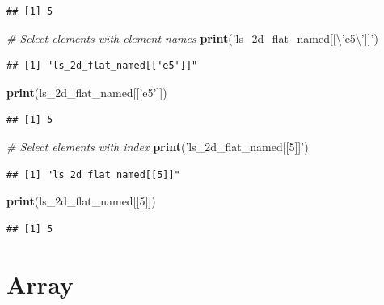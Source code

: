 \documentclass[
]{book}
\newenvironment{Shaded}{\begin{snugshade}}{\end{snugshade}}
\newcommand{\CharTok}[1]{\textcolor[rgb]{0.31,0.60,0.02}{#1}}
\newcommand{\CommentTok}[1]{\textcolor[rgb]{0.56,0.35,0.01}{\textit{#1}}}
\newcommand{\DecValTok}[1]{\textcolor[rgb]{0.00,0.00,0.81}{#1}}
\newcommand{\KeywordTok}[1]{\textcolor[rgb]{0.13,0.29,0.53}{\textbf{#1}}}
\newcommand{\NormalTok}[1]{#1}
\newcommand{\StringTok}[1]{\textcolor[rgb]{0.31,0.60,0.02}{#1}}
\begin{document}
\begin{verbatim}
## [1] 5
\end{verbatim}

\begin{Shaded}
\begin{Highlighting}[]
\CommentTok{# Select elements with element names}
\KeywordTok{print}\NormalTok{(}\StringTok{'ls_2d_flat_named[[}\CharTok{\textbackslash{}'}\StringTok{e5}\CharTok{\textbackslash{}'}\StringTok{]]'}\NormalTok{)}
\end{Highlighting}
\end{Shaded}

\begin{verbatim}
## [1] "ls_2d_flat_named[['e5']]"
\end{verbatim}

\begin{Shaded}
\begin{Highlighting}[]
\KeywordTok{print}\NormalTok{(ls_2d_flat_named[[}\StringTok{'e5'}\NormalTok{]])}
\end{Highlighting}
\end{Shaded}

\begin{verbatim}
## [1] 5
\end{verbatim}

\begin{Shaded}
\begin{Highlighting}[]
\CommentTok{# Select elements with index}
\KeywordTok{print}\NormalTok{(}\StringTok{'ls_2d_flat_named[[5]]'}\NormalTok{)}
\end{Highlighting}
\end{Shaded}

\begin{verbatim}
## [1] "ls_2d_flat_named[[5]]"
\end{verbatim}

\begin{Shaded}
\begin{Highlighting}[]
\KeywordTok{print}\NormalTok{(ls_2d_flat_named[[}\DecValTok{5}\NormalTok{]])}
\end{Highlighting}
\end{Shaded}

\begin{verbatim}
## [1] 5
\end{verbatim}

\hypertarget{array}{%
\section{Array}\label{array}}
\end{document}
